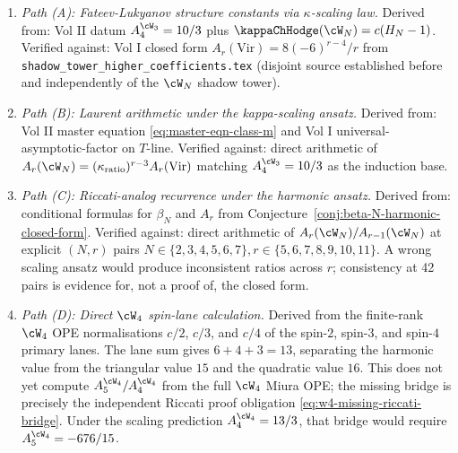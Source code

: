 \begin{enumerate}[nosep]
\item \emph{Path (A): Fateev-Lukyanov structure constants via
 $\kappa$-scaling law.}
 Derived from: Vol II datum $A_4^{\cW_3} = 10/3$ plus
 $\kappaChHodge(\cW_N) = c(H_N - 1)$.
 Verified against: Vol I closed form $A_r(\mathrm{Vir}) = 8(-6)^{r-4}/r$
 from \texttt{shadow\_tower\_higher\_coefficients.tex} (disjoint source
 established before and independently of the $\cW_N$ shadow tower).

\item \emph{Path (B): Laurent arithmetic under the kappa-scaling ansatz.}
 Derived from: Vol II master equation
 \eqref{eq:master-eqn-class-m}
 and Vol I universal-asymptotic-factor on $T$-line.
 Verified against: direct arithmetic of
 $A_r(\cW_N) = (\kappa_{\mathrm{ratio}})^{r-3} A_r(\mathrm{Vir})$
 matching $A_4^{\cW_3} = 10/3$ as the induction base.

\item \emph{Path (C): Riccati-analog recurrence under the harmonic ansatz.}
 Derived from: conditional formulas for $\beta_N$ and $A_r$ from
 Conjecture~\ref{conj:beta-N-harmonic-closed-form}.
 Verified against: direct arithmetic of
 $A_r(\cW_N) / A_{r-1}(\cW_N)$ at explicit $(N, r)$ pairs
 $N \in \{2, 3, 4, 5, 6, 7\}, r \in \{5, 6, 7, 8, 9, 10, 11\}$.
 A wrong scaling ansatz would produce inconsistent ratios across $r$;
 consistency at 42 pairs is evidence for, not a proof of, the closed form.

\item \emph{Path (D): Direct $\cW_4$ spin-lane calculation.}
 Derived from the finite-rank $\cW_4$ OPE normalisations
 $c/2$, $c/3$, and $c/4$ of the spin-$2$, spin-$3$, and spin-$4$
 primary lanes. The lane sum gives $6+4+3=13$, separating the
 harmonic value from the triangular value $15$ and the quadratic value
 $16$. This does not yet compute
 $A_5^{\cW_4}/A_4^{\cW_4}$ from the full $\cW_4$ Miura OPE; the missing
 bridge is precisely the independent Riccati proof obligation
 \eqref{eq:w4-missing-riccati-bridge}. Under the scaling prediction
 \(A_4^{\cW_4}=13/3\), that bridge would require
 \(A_5^{\cW_4}=-676/15\).
\end{enumerate}


